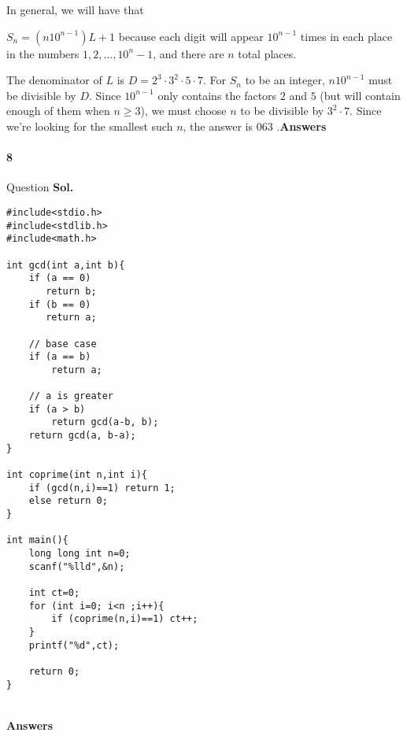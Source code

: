 \documentclass[12pt]{amsart}
\begin{document}
In general, we will have that

$S_n = (n10^{n-1})L + 1$
because each digit will appear $10^{n - 1}$ times in each place in the numbers $1, 2, \ldots, 10^{n} - 1$, and there are $n$ total places.

The denominator of $L$ is $D = 2^3\cdot 3^2\cdot 5\cdot 7$. For $S_n$ to be an integer, $n10^{n-1}$ must be divisible by $D$. Since $10^{n-1}$ only contains the factors $2$ and $5$ (but will contain enough of them when $n \geq 3$), we must choose $n$ to be divisible by $3^2\cdot 7$. Since we're looking for the smallest such $n$, the answer is ${063}$ .\textbf{Answers}\\
\bigskip
\paragraph*{8} Question
\bigskip
\textbf{Sol.} \\
\begin{verbatim}
#include<stdio.h>
#include<stdlib.h>
#include<math.h>

int gcd(int a,int b){
    if (a == 0)
       return b;
    if (b == 0)
       return a;
 
    // base case
    if (a == b)
        return a;
 
    // a is greater
    if (a > b)
        return gcd(a-b, b);
    return gcd(a, b-a);
}

int coprime(int n,int i){
    if (gcd(n,i)==1) return 1;
    else return 0;
}

int main(){
    long long int n=0;
    scanf("%lld",&n);

    int ct=0;
    for (int i=0; i<n ;i++){
        if (coprime(n,i)==1) ct++;
    }
    printf("%d",ct);
    
    return 0;
}
\end{verbatim}
\\\textbf{Answers}\\
\bigskip
\end{document}
